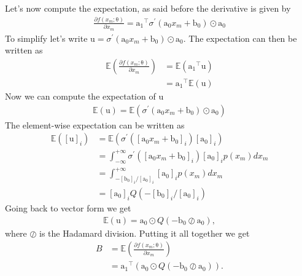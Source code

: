 \documentclass[12pt]{article}
\newcommand{\vect}[1]{\boldsymbol{\mathrm{#1}}}
\newcommand{\expt}[1]{\mathbb{E}\left(#1\right)}
\theoremstyle{remark}
\begin{document}
Let's now compute the expectation, as said before the derivative is given by 
\begin{align}
	\frac{\partial f(x_m; \vect{\theta})}{\partial x_m} =  \vect{a_1}^{\intercal} \sigma^{\prime}(\vect{a_0}x_m + \vect{b_0}) \odot \vect{a_0}
\end{align}
To simplify let's write $\vect{u} = \sigma^{\prime}(\vect{a_0}x_m + \vect{b_0}) \odot \vect{a_0}$.
The expectation can then be written as
\begin{align}
	\expt{\frac{\partial f(x_m; \vect{\theta})}{\partial x_m}} &= \expt{ \vect{a_1}^{\intercal} \vect{u}}\\
	&=  \vect{a_1}^{\intercal} \expt{\vect{u}}
\end{align}
Now we can compute the expectation of $\vect{u}$
\begin{align}
	\expt{\vect{u}} = \expt{\sigma^{\prime}(\vect{a_0}x_m + \vect{b_0}) \odot \vect{a_0}}
\end{align}
The element-wise expectation can be written as
\begin{align}
	\expt{[\vect{u}]_i} &= \expt{\sigma^{\prime}([\vect{a_0}x_m + \vect{b_0}]_i) [\vect{a_0}]_i}\\
	&= \int_{-\infty}^{+\infty} \sigma^{\prime}([\vect{a_0}x_m + \vect{b_0}]_i) [\vect{a_0}]_i p(x_m) dx_m\\
	&= \int_{-[\vect{b_0}]_i/[\vect{a_0}]_i}^{+\infty}  [\vect{a_0}]_i p(x_m) dx_m \\
	&= [\vect{a_0}]_i Q(-[\vect{b_0}]_i/[\vect{a_0}]_i)
\end{align}
Going back to vector form we get 
\begin{align}
	\expt{\vect{u}} = \vect{a_0} \odot Q(-\vect{b_0}\oslash\vect{a_0}),
\end{align}
where $\oslash$ is the Hadamard division.
Putting it all together we get 
\begin{align}
	B &=\expt{\frac{\partial f(x_m; \vect{\theta})}{\partial x_m}} \\
	&= \vect{a_1}^{\intercal} \left(\vect{a_0} \odot Q(-\vect{b_0}\oslash\vect{a_0})\right).\label{eq:bussgang_1layer}
\end{align}
\end{document}
